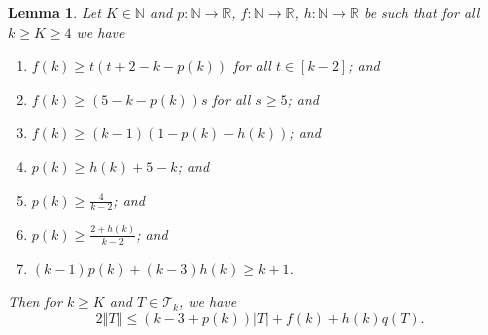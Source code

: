 \documentclass[12pt]{article}
\theoremstyle{plain}
\newtheorem{lem}[thm]{Lemma}
\theoremstyle{definition}
\theoremstyle{remark}
\newcommand{\fancy}[1]{\mathcal{#1}}
\newcommand{\IN}{\mathbb{N}}
\newcommand{\IR}{\mathbb{R}}
\newcommand{\T}{\fancy{T}}
\newcommand{\card}[1]{\left|#1\right|}
\newcommand{\size}[1]{\left\Vert#1\right\Vert}
\newcommand{\func}[3]{#1\colon #2 \rightarrow #3}
\newcommand{\irange}[1]{\left[#1\right]}
\begin{document}
\begin{lem}\label{BoundFamily}
	Let $K \in \IN$ and $\func{p}{\IN}{\IR}$, $\func{f}{\IN}{\IR}$, $\func{h}{\IN}{\IR}$ be such that for all $k \ge K \ge 4$ we have
	\begin{enumerate}
		\item $f(k) \ge t(t+2-k-p(k))$ for all $t \in \irange{k-2}$; and
    	\item $f(k) \ge (5-k-p(k))s$ for all $s \ge 5$; and
		\item $f(k) \ge (k-1)(1- p(k) - h(k))$; and	
		\item $p(k) \ge h(k) + 5 - k$; and
		\item $p(k) \ge \frac{4}{k-2}$; and
		\item $p(k) \ge \frac{2+h(k)}{k-2}$; and
		\item $(k-1)p(k) + (k-3)h(k) \ge k+1$.
	\end{enumerate}
	Then for $k \ge K$ and $T \in \T_k$, we have
	\[2\size{T} \le (k-3 + p(k))\card{T} + f(k) + h(k)q(T).\]
\end{lem}
\end{document}
